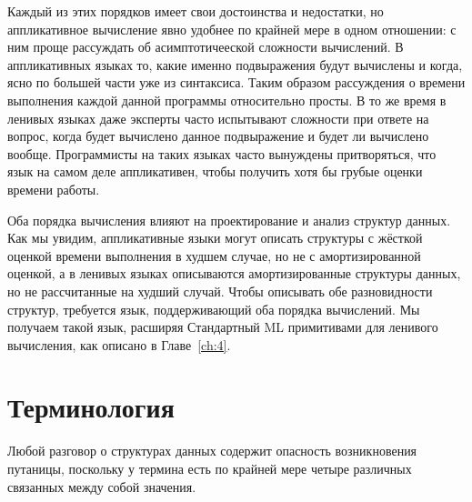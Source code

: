 Каждый из этих порядков имеет свои достоинства и недостатки, но
аппликативное вычисление явно удобнее по крайней мере в одном
отношении: с ним проще рассуждать об асимптотичееской сложности
вычислений.  В аппликативных языках то, какие именно подвыражения
будут вычислены и когда, ясно по большей части уже из синтаксиса.
Таким образом рассуждения о времени выполнения каждой данной программы
относительно просты.  В то же время в ленивых языках даже эксперты
часто испытывают сложности при ответе на вопрос, когда будет вычислено
данное подвыражение и будет ли вычислено вообще.  Программисты на
таких языках часто вынуждены притворяться, что язык на самом деле
аппликативен, чтобы получить хотя бы грубые оценки времени работы.

Оба порядка вычисления влияют на проектирование и анализ структур
данных. Как мы увидим, аппликативные языки могут описать структуры с
жёсткой оценкой времени выполнения в худшем случае, но не с амортизированной
оценкой, а в ленивых языках описываются амортизированные структуры
данных, но не рассчитанные на худший случай. Чтобы описывать обе
разновидности структур, требуется язык, поддерживающий оба
порядка вычислений. Мы получаем такой язык, расширяя Стандартный ML
примитивами для ленивого вычисления, как описано в Главе~\ref{ch:4}.

\section{Терминология}

Любой разговор о структурах данных содержит опасность возникновения путаницы,
поскольку у термина  есть по
крайней мере четыре различных связанных между собой значения.

